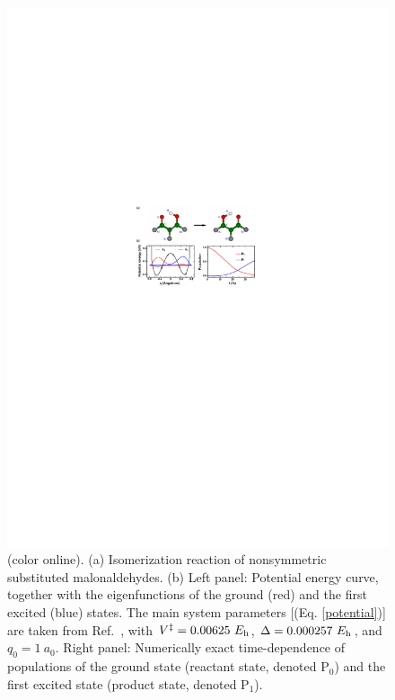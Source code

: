 \documentclass[twocolumn,showpacs,twoside,10pt,prl]{revtex4}
\begin{document}
\begin{figure}[htb]
\begin{center}
\includegraphics[width= 0.95\columnwidth]{fig1.pdf}
\end{center}
\setlength{\abovecaptionskip}{-0.35cm}
\caption{\footnotesize{(color online). (a) Isomerization reaction of nonsymmetric substituted malonaldehydes.
(b) Left panel: Potential energy curve, together with the eigenfunctions of
    the ground (red) and the first excited (blue) states.
    The main system parameters [(Eq. \ref{potential})] are taken from Ref.\ \cite{hsubway}, with
    $V^\ddag=0.00625\ E_{\rm h}$, $\Delta=0.000257\ E_{\rm h}$, and $q_0=1\ a_0$.
    Right panel: Numerically exact time-dependence of populations of the ground state (reactant state, denoted P$_0$) and the first excited state
    (product state, denoted P$_1$).}}\label{fig1}
\end{figure}
\end{document}
